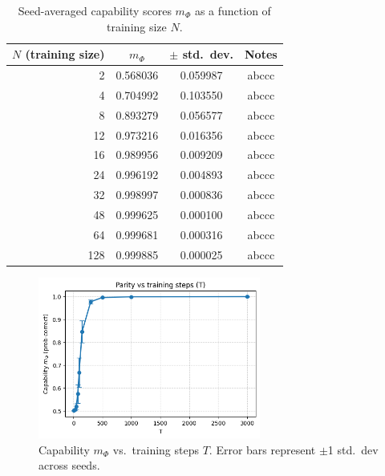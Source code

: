 \documentclass[12pt]{article}
\begin{document}
\begin{table}[h]
\centering
\begin{tabular}{rccc}
\toprule
$N$ (training size) & $m_\Phi$ & $\pm$ std.~dev. & Notes \\
\midrule
2  & 0.568036 & 0.059987 & abccc \\
4  & 0.704992 &  0.103550 & abccc \\
8 & 0.893279 & 0.056577 & abccc \\
12 & 0.973216 & 0.016356 & abccc \\
16 & 0.989956 & 0.009209 & abccc \\
24 & 0.996192 & 0.004893 & abccc \\
32 & 0.998997 & 0.000836 & abccc \\
48 & 0.999625 & 0.000100 & abccc \\
64 & 0.999681 & 0.000316 & abccc \\
128 & 0.999885 & 0.000025 & abccc \\
\bottomrule
\end{tabular}
\caption{Seed-averaged capability scores $m_\Phi$ as a function of training size $N$.}
\label{tab:mphi-results}
\end{table}
\clearpage

\begin{figure}[h]
    \centering
    \includegraphics[width=0.65\textwidth]{A1_parity/parity_T.png}
    \caption{Capability $m_\Phi$ vs.~training steps $T$. Error bars represent $\pm$1 std.~dev across seeds.}
    \label{fig:mphi-scaling}
\end{figure}
\end{document}
